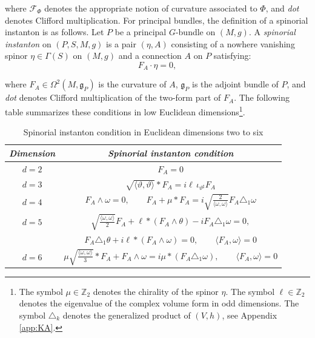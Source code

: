 \documentclass[10pt,a4paper,twoside,reqno]{amsart}
\theoremstyle{plain}
\theoremstyle{definition}
\theoremstyle{remark}
\def\Z{\mathbb{Z}}
\def\frg{\mathfrak{g}}
\def\cF{\mathcal{F}}
\newcommand{\escal}[1]{\langle#1\rangle}
\begin{document}
\noindent
where $\cF_{\Phi}$ denotes the appropriate notion of curvature associated to $\Phi$, and \emph{dot} denotes Clifford multiplication. For principal bundles, the definition of a spinorial instanton is as follows. Let $P$ be a principal $G$-bundle on $(M,g)$. A \emph{spinorial instanton} on $(P,S,M,g)$ is a pair $(\eta,A)$ consisting of a nowhere vanishing spinor $\eta\in \Gamma(S)$ on $(M,g)$ and a connection $A$ on $P$ satisfying:
\begin{equation*}
F_A \cdot \eta = 0,
\end{equation*}

\noindent
where $F_A \in \Omega^2(M,\frg_P)$ is the curvature of $A$, $\frg_P$ is the adjoint bundle of $P$, and \emph{dot} denotes Clifford multiplication of the two-form part of $F_A$. The following table summarizes these conditions in low Euclidean dimensions\footnote{The symbol $\mu\in\Z_2$ denotes the chirality of the spinor $\eta$. The symbol $\ell\in\Z_2$ denotes the eigenvalue of the complex volume form in odd dimensions. The symbol $\triangle_k$ denotes the generalized product of $(V,h)$, see Appendix \ref{app:KA}.}.

\begin{table}[!ht]
\centering
\caption{Spinorial instanton condition in Euclidean dimensions two to six}
\label{tab:F_conditions_simple}
\renewcommand{\arraystretch}{2.5} 
\begin{tabular}{|c|c|}
\hline
\emph{Dimension} & \emph{Spinorial instanton condition} \\
\hline
$d=2$ & 
$F_A = 0$
\\
\hline
$d=3$ & 
$\sqrt{\langle\vartheta,\vartheta\rangle}\ast F_A = i\ell\,\iota_{\vartheta^\sharp}F_A$
\\
\hline
$d=4$ & 
$F_A\wedge\omega=0,\qquad    F_A+\mu \ast F_A = i \sqrt{\frac{2}{ \escal{\omega,\omega}}} F_A\triangle_1\omega$
\\
\hline
$d=5$ & 
$\sqrt{\frac{\escal{\omega,\omega}}{2}} F_A + \ell*(F_A\wedge\theta)-iF_A\triangle_1\omega=0,$\\
& $F_A\triangle_1\theta+i\ell*(F_A\wedge\omega)=0,\qquad\escal{F_A,\omega}=0$
\\
\hline
$d=6$ & 
$\mu\sqrt{\frac{\escal{\omega,\omega}}{3}} \ast F_A + F_A\wedge\omega = i\mu*(F_A\triangle_1\omega) ,\qquad \escal{F_A,\omega}=0$
\\
\hline
\end{tabular}
\end{table}
\end{document}
